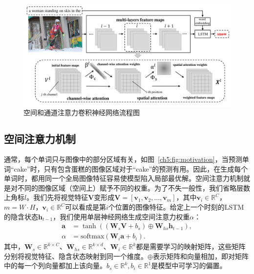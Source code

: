 \begin{figure}[tbp]
    \centering
    \includegraphics[width=\linewidth]{chapter5/res/architecture.pdf}
    \caption{空间和通道注意力卷积神经网络流程图}
    \label{ch5:fig:architecture}
\end{figure}


\subsection{空间注意力机制}
通常，每个单词只与图像中的部分区域有关，如图~\ref{ch5:fig:motivation}，当预测单词“cake”时，只有包含蛋糕的图像区域对于“cake”的预测有用。因此，在生成每个单词时，都用同一个全局图像特征容易使模型陷入局部最优解。空间注意力机制就是对不同的图像区域（空间上）赋予不同的权重。为了不失一般性，我们省略层数上角标$l$。我们先将视觉特征$\mathbf{V}$变形成$\mathbf{V}  = \left[\mathbf{v}_1, \mathbf{v}_2, ..., \mathbf{v}_m
\right]$，其中$\mathbf{v}_i\in\mathbb{R}^C$，$m=W\cdot H$，$\mathbf{v}_i\in\mathbb{R}^C$可以看成是第$i$个位置的图像特征。给定上一个时刻的LSTM的隐含状态$\mathbf{h}_{t-1}$，我们使用单层神经网络生成空间注意力权重$\alpha$：
\begin{equation} \label{ch5:eq:eq_5}
\begin{split}
\mathbf{a} & = \tanh \left( \left( \mathbf{W}_s \mathbf{V} + b_s \right) \oplus \mathbf{W}_{hs}\mathbf{h}_{t-1}\right), \\
\alpha & = \textrm{softmax} \left( \mathbf{W}_i \mathbf{a} + b_i \right).
\end{split}
\end{equation}
其中，$\mathbf{W}_s \in \mathbb{R}^{k \times C}$、$\mathbf{W}_{hs} \in \mathbb{R}^{k \times d}$、$\mathbf{W}_i \in \mathbb{R}^k$都是需要学习的映射矩阵，这些矩阵分别将视觉特征、隐含状态映射到同一个维度。$\oplus$表示矩阵和向量相加，即对矩阵中的每一个列向量都加上该向量。$b_s \in \mathbb{R}^k, b_i \in \mathbb{R}^1$是模型中可学习的偏置。


